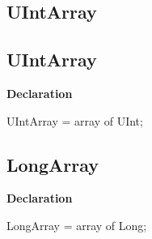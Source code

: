 \documentclass{report}
\newif\ifpdf
\begin{document}
\subsection*{\large{\textbf{UIntArray}}\normalsize\hspace{1ex}\hrulefill}
\else
\subsection*{UIntArray}
\fi
\label{NewPascal.Base-UIntArray}
\begin{list}{}{
\setlength{\itemindent}{0cm}
\setlength{\listparindent}{0cm}
\setlength{\leftmargin}{\evensidemargin}
\addtolength{\leftmargin}{\tmplength}
\settowidth{\labelsep}{X}
\addtolength{\leftmargin}{\labelsep}
\setlength{\labelwidth}{\tmplength}
}
\item[\textbf{Declaration}\hfill]
\ifpdf
\begin{flushleft}
\fi
\begin{ttfamily}
UIntArray = array of UInt;\end{ttfamily}

\ifpdf
\end{flushleft}
\fi

\end{list}
\ifpdf
\subsection*{\large{\textbf{LongArray}}\normalsize\hspace{1ex}\hrulefill}
\else
\subsection*{LongArray}
\fi
\label{NewPascal.Base-LongArray}
\begin{list}{}{
\setlength{\itemindent}{0cm}
\setlength{\listparindent}{0cm}
\setlength{\leftmargin}{\evensidemargin}
\addtolength{\leftmargin}{\tmplength}
\settowidth{\labelsep}{X}
\addtolength{\leftmargin}{\labelsep}
\setlength{\labelwidth}{\tmplength}
}
\item[\textbf{Declaration}\hfill]
\ifpdf
\begin{flushleft}
\fi
\begin{ttfamily}
LongArray = array of Long;\end{ttfamily}

\ifpdf
\end{flushleft}
\fi

\end{list}
\ifpdf
\end{document}
